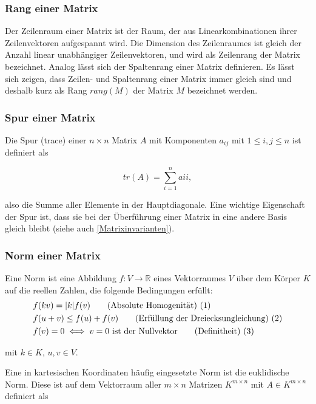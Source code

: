 \documentclass[a4paper,fontsize=12pt,toc=bib,parskip=half,ngerman]{scrartcl}
\begin{document}
\subsubsection{Rang einer Matrix}
Der Zeilenraum einer Matrix ist der Raum, der aus Linearkombinationen ihrer Zeilenvektoren aufgespannt wird. Die Dimension des Zeilenraumes ist gleich der Anzahl linear unabh\"angiger Zeilenvektoren, und wird als Zeilenrang der Matrix bezeichnet. Analog l\"asst sich der Spaltenrang einer Matrix definieren. Es l\"asst sich zeigen, dass Zeilen- und Spaltenrang einer Matrix immer gleich sind und deshalb kurz als Rang $rang(M)$ der Matrix $M$ bezeichnet werden.

\subsubsection{Spur einer Matrix}
Die Spur (trace) einer $n\times n$ Matrix $A$ mit Komponenten $a_{ij}$ mit $1 \leq i,j \leq n$ ist definiert als

\begin{equation}
	tr(A) = \sum_{i = 1}^{n} a{ii},
\end{equation}

also die Summe aller Elemente in der Hauptdiagonale. Eine wichtige Eigenschaft der Spur ist, dass sie bei der \"Uberf\"uhrung einer Matrix in eine andere Basis gleich bleibt (siehe auch \cref{Matrixinvarianten}).


\subsubsection{Norm einer Matrix}
Eine Norm ist eine Abbildung $f: V \rightarrow \mathbb{R}$ eines Vektorraumes $V$ \"uber dem K\"orper $K$ auf die reellen Zahlen, die folgende Bedingungen erf\"ullt:
\begin{align}
	&f(kv) = |k|f(v) \tag{Absolute Homogenit\"at) (\addtocounter{equation}{1}\theequation}\\
	&f(u+v) \leq f(u) + f(v) \tag{Erf\"ullung der Dreiecksungleichung) (\addtocounter{equation}{1}\theequation}\\
	&f(v) = 0 \iff v=0 \text{ ist der Nullvektor} \tag{Definitheit) (\addtocounter{equation}{1}\theequation}
\end{align}

mit $k \in K$, $u,v \in V$.


Eine in kartesischen Koordinaten h\"aufig eingesetzte Norm ist die euklidische Norm. Diese ist auf dem Vektorraum aller $m \times n$ Matrizen $K^{m\times n}$ mit $A \in K^{m\times n}$ definiert als
\end{document}
